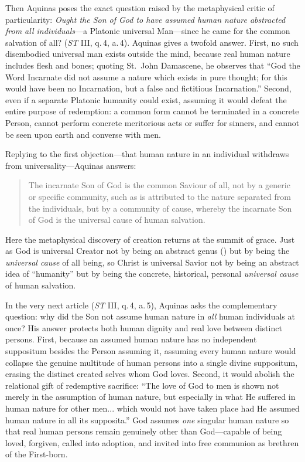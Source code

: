 Then Aquinas poses the exact question raised by the metaphysical critic of particularity: \emph{Ought the Son of God to have assumed human nature abstracted from all individuals}---a Platonic universal Man---since he came for the common salvation of all? (\textit{ST} III, q.\,4, a.\,4). Aquinas gives a twofold answer. First, no such disembodied universal man exists outside the mind, because real human nature includes flesh and bones; quoting St.\ John Damascene, he observes that ``God the Word Incarnate did not assume a nature which exists in pure thought; for this would have been no Incarnation, but a false and fictitious Incarnation.'' Second, even if a separate Platonic humanity could exist, assuming it would defeat the entire purpose of redemption: a common form cannot be terminated in a concrete Person, cannot perform concrete meritorious acts or suffer for sinners, and cannot be seen upon earth and converse with men.

Replying to the first objection---that human nature in an individual withdraws from universality---Aquinas answers:

\begin{quote}
The incarnate Son of God is the common Saviour of all, not by a generic or specific community, such as is attributed to the nature separated from the individuals, but by a community of cause, whereby the incarnate Son of God is the universal cause of human salvation.
\end{quote}

Here the metaphysical discovery of creation returns at the summit of grace. Just as God is universal Creator not by being an abstract genus () but by being the \textit{universal cause} of all being, so Christ is universal Savior not by being an abstract idea of ``humanity'' but by being the concrete, historical, personal \textit{universal cause} of human salvation.

In the very next article (\textit{ST} III, q.\,4, a.\,5), Aquinas asks the complementary question: why did the Son not assume human nature in \emph{all} human individuals at once? His answer protects both human dignity and real love between distinct persons. First, because an assumed human nature has no independent suppositum besides the Person assuming it, assuming every human nature would collapse the genuine multitude of human persons into a single divine suppositum, erasing the distinct created selves whom God loves. Second, it would abolish the relational gift of redemptive sacrifice: ``The love of God to men is shown not merely in the assumption of human nature, but especially in what He suffered in human nature for other men... which would not have taken place had He assumed human nature in all its supposita.'' God assumes \emph{one} singular human nature so that real human persons remain genuinely other than God---capable of being loved, forgiven, called into adoption, and invited into free communion as brethren of the First-born.


